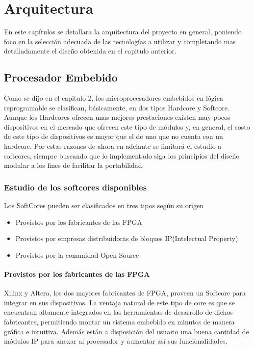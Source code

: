 \chapter{Arquitectura}
En este capítulos se detallara la arquitectura del proyecto en general, poniendo foco en la selección adecuada de las tecnologías a utilizar y completando mas detalladamente el diseño obtenida en el capitulo anterior.

\section{Procesador Embebido}

Como se dijo en el capitulo 2, los microprocesadores embebidos en lógica reprogramable se clasifican, básicamente, en dos tipos Hardcore y Softcore. Aunque los Hardcores ofrecen unas mejores prestaciones existen muy pocos dispositivos en el mercado que ofrecen este tipo de módulos y, en general, el costo de este tipo de dispositivos es mayor que el de uno que no cuenta con un hardcore. Por estas razones de ahora en adelante se limitará el estudio a softcores, siempre buscando que lo implementado siga los principios del diseño modular a los fines de facilitar la portabilidad.
\subsection{Estudio de los softcores disponibles}
Los SoftCores pueden ser clasificados en tres tipos según su origen

\begin{itemize}
	\item Provistos por los fabricantes de las FPGA
	\item Provistos por empresas distribuidoras de bloques IP(Intelectual Property)
	\item Provistos por la comunidad Open Source
\end{itemize}

\subsubsection{Provistos por los fabricantes de las FPGA}
Xilinx y Altera, los dos mayores fabricantes de FPGA, proveen un Softcore para integrar en sus dispositivos. La ventaja natural de este tipo de core es que se encuentran altamente integrados en las herramientas de desarrollo de dichos fabricantes, permitiendo montar un sistema embebido en minutos de manera gráfica e intuitiva. Además están a disposición del usuario una buena cantidad de  módulos IP para anexar al procesador y aumentar así sus funcionalidades. 

